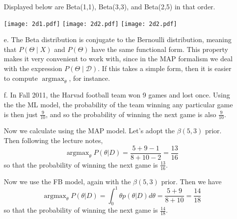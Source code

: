 \documentclass[12pt]{amsart}
\newcommand{\cal}[1]{\mathcal{#1}}
\DeclareMathOperator{\argmax}{argmax}
\theoremstyle{remark}
\begin{document}
\begin{enumerate}
Displayed below are Beta(1,1), Beta(3,3), and Beta(2,5) in that order. 

\texttt{[image: 2d1.pdf]}
\texttt{[image: 2d2.pdf]}
\texttt{[image: 2d2.pdf]}

\item[e.] The Beta distribution is conjugate to the Bernoulli distribution, meaning that $P(\Theta \mid X)$ and $P(\Theta)$ have the same functional form. This property makes it very convenient to work with, since in the MAP formalism we deal with the expression $P(\Theta \mid \cal{D})$. If this takes a simple form, then it is easier to compute $\argmax_{\theta}$, for instance. 

\item[f.]
In Fall 2011, the Harvad football team won 9 games and lost once. Using the the ML model, the probability of the team winning any particular game is then just $\frac{9}{10}$, and so the probability of winning the next game is also $\frac{9}{10}$.

Now we calculate using the MAP model. Let's adopt the $\beta(5,3)$ prior. Then following the lecture notes, 
\[
\argmax_{\theta}P(\theta|D) = \frac{5+9-1}{8+10-2}=\frac{13}{16}
\]
so that the probability of winning the next game is $\frac{13}{16}$.

Now we use the FB model, again with the $\beta(5,3)$ prior. Then we have
\[
\argmax_{\theta}P(\theta|D) = \int_{0}^1 \theta p(\theta|D) d\theta=\frac{5+9}{8+10}=\frac{14}{18}
\]
so that the probability of winning the next game is $\frac{14}{18}$.
\end{enumerate}
\end{document}
